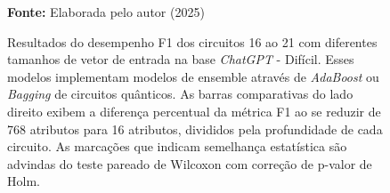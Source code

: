\begin{figure}
\caption{Resultados do desempenho F1 dos circuitos 16 ao 21 com diferentes tamanhos de vetor de entrada na base \textit{ChatGPT} - Difícil. Esses modelos implementam modelos de ensemble através de \textit{AdaBoost} ou \textit{Bagging} de circuitos quânticos. As barras comparativas do lado direito exibem a diferença percentual da métrica F1 ao se reduzir de 768 atributos para 16 atributos, divididos pela profundidade de cada circuito. As marcações que indicam semelhança estatística são advindas do teste pareado de Wilcoxon com correção de p-valor de Holm.}
\label{fig:n_features:hard:g6}
     \centering
    \centering
      \par\medskip\ABNTEXfontereduzida\selectfont\textbf{Fonte:} Elaborada pelo autor (2025) \par\medskip
\end{figure}
